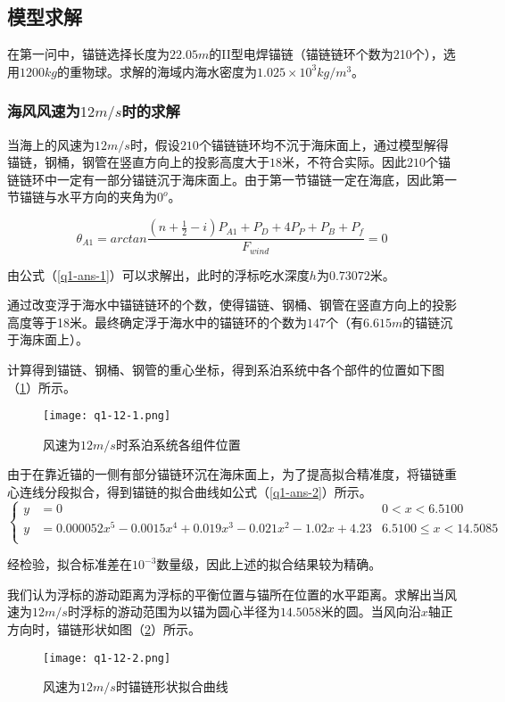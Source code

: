\documentclass[withoutpreface,bwprint]{cumcmthesis} %
\begin{document}
\subsection{模型求解}
\par 在第一问中，锚链选择长度为$22.05m$的II型电焊锚链（锚链链环个数为210个），选用$1200kg$的重物球。求解的海域内海水密度为$1.025×10^3kg/m^3$。

\subsubsection{海风风速为$12m/s$时的求解}

\par 当海上的风速为$12m/s$时，假设$210$个锚链链环均不沉于海床面上，通过模型解得锚链，钢桶，钢管在竖直方向上的投影高度大于$18$米，不符合实际。因此$210$个锚链链环中一定有一部分锚链沉于海床面上。由于第一节锚链一定在海底，因此第一节锚链与水平方向的夹角为$0^o$。

\begin{equation}
	\label{q1-ans-1}
	\theta_{A1} = arctan\frac{(n + \frac{1}{2} - i)P_{A1} +P_D+4P_P+P_B+P_f}{F_{wind}} = 0 
\end{equation}
\par 由公式（\ref{q1-ans-1}）可以求解出，此时的浮标吃水深度$h$为$0.73072$米。
\par 通过改变浮于海水中锚链链环的个数，使得锚链、钢桶、钢管在竖直方向上的投影高度等于18米。最终确定浮于海水中的锚链环的个数为$147$个（有$6.615m$的锚链沉于海床面上）。
\par 计算得到锚链、钢桶、钢管的重心坐标，得到系泊系统中各个部件的位置如下图（\ref{fig:q1-12-1}）所示。
\begin{figure}[h]
\small
\centering
\texttt{[image: q1-12-1.png]}
\caption{风速为$12m/s$时系泊系统各组件位置} \label{fig:q1-12-1}
\end{figure}
\par 由于在靠近锚的一侧有部分锚链环沉在海床面上，为了提高拟合精准度，将锚链重心连线分段拟合，得到锚链的拟合曲线如公式（\ref{q1-ans-2}）所示。
\begin{equation}
	\label{q1-ans-2}
	\left\{
\begin{aligned}
y & = 0& 	0<x<6.5100\\
y & = 0.000052x^5-0.0015x^4+0.019x^3-0.021x^2-1.02x+ 4.23 &  	6.5100\leqslant x<14.5085\\
\end{aligned}
\right.
\end{equation}
\par 经检验，拟合标准差在$10^{-3}$数量级，因此上述的拟合结果较为精确。
\par 我们认为浮标的游动距离为浮标的平衡位置与锚所在位置的水平距离。求解出当风速为$12m/s$时浮标的游动范围为以锚为圆心半径为$14.5058$米的圆。当风向沿$x$轴正方向时，锚链形状如图（\ref{fig:q1-12-2}）所示。
\begin{figure}[h]
\small
\centering
\texttt{[image: q1-12-2.png]}
\caption{风速为$12m/s$时锚链形状拟合曲线} \label{fig:q1-12-2}
\end{figure}
\newpage
\end{document}
